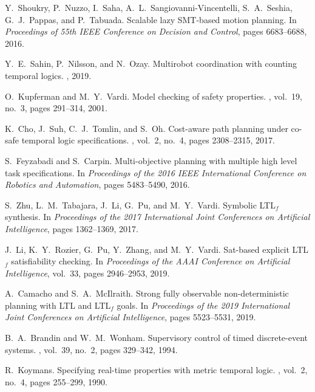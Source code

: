 \documentclass[journal,twoside,web]{IEEEtran}
\begin{document}
\begin{thebibliography}{99}
%
Y.~Shoukry, P.~Nuzzo, I.~Saha, A.~L.~Sangiovanni-Vincentelli, S.~A.~Seshia, G.~J.~Pappas, and P.~Tabuada.
\newblock Scalable lazy SMT-based motion planning.
\newblock In {\em Proceedings of 55th IEEE Conference on Decision and Control}, pages 6683--6688, 2016.

%
Y.~E.~Sahin, P.~Nilsson, and N.~Ozay.
\newblock Multirobot coordination with counting temporal logics.
, 2019.

%
O.~Kupferman and M.~Y.~Vardi.
\newblock Model checking of safety properties.
, vol.~19, no.~3, pages 291--314, 2001.

%
K.~Cho, J.~Suh, C.~J.~Tomlin, and S.~Oh.
\newblock Cost-aware path planning under co-safe temporal logic specifications.
, vol.~2, no.~4, pages 2308--2315, 2017.

%
S.~Feyzabadi and S.~Carpin.
\newblock Multi-objective planning with multiple high level task specifications.
\newblock In {\em Proceedings of the 2016 IEEE International Conference on Robotics and Automation}, pages 5483--5490, 2016.

%
S.~Zhu, L.~M.~Tabajara, J.~Li, G.~Pu, and M.~Y.~Vardi.
\newblock Symbolic LTL$_f$ synthesis.
\newblock In {\em  Proceedings of the 2017 International Joint Conferences on Artificial Intelligence}, pages 1362--1369, 2017.

%
J.~Li, K.~Y.~Rozier, G.~Pu, Y.~Zhang, and M.~Y.~Vardi.
\newblock Sat-based explicit LTL$_f$ satisfiability checking.
\newblock In {\em Proceedings of the AAAI Conference on Artificial Intelligence}, vol.~33, pages 2946--2953, 2019.

%
A.~Camacho and S.~A.~McIlraith.
\newblock Strong fully observable non-deterministic planning with LTL and LTL$_f$ goals.
\newblock In {\em Proceedings of the 2019 International Joint Conferences on Artificial Intelligence}, pages 5523--5531, 2019.

%
B.~A.~{Brandin} and W.~M.~{Wonham}.
\newblock Supervisory control of timed discrete-event systems.
, vol.~39, no.~2, pages 329--342, 1994.

%
R.~Koymans.
\newblock Specifying real-time properties with metric temporal logic.
, vol.~2, no.~4, pages 255--299, 1990.


\end{thebibliography}
\end{document}
